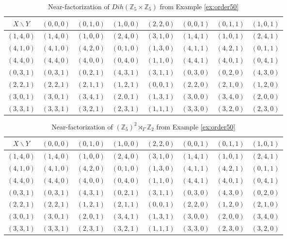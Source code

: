 \documentclass[12pt, a4paper]{article}
\theoremstyle{definition}
\begin{document}
\begin{table}[h]
\renewcommand{\arraystretch}{1.2}
\centering
\setlength\tabcolsep{3pt}
\begin{tabular}{|c|ccccccc|} 
\hline
$X \backslash Y$ & $(0,0,0)$ & $(0,1,0)$ & $(1,0,0)$ & $(2,2,0)$ & $(0,0,1)$ & $(0,1,1)$ & $(1,0,1)$ \\ \hline
$(1,4,0)$ & $(1,4,0)$ & $(1,0,0)$ & $(2,4,0)$ & $(3,1,0)$ & $(1,4,1)$ & $(1,0,1)$ & $(2,4,1)$ 
\\
$(4,1,0)$ & $(4,1,0)$ & $(4,2,0)$ & $(0,1,0)$ & $(1,3,0)$ & $(4,1,1)$ & $(4,2,1)$ & $(0,1,1)$ 
\\
$(4,4,0)$ & $(4,4,0)$ & $(4,0,0)$ & $(0,4,0)$ & $(1,1,0)$ & $(4,4,1)$ & $(4,0,1)$ & $(0,4,1)$ 
\\
$(0,3,1)$ & $(0,3,1)$ & $(0,2,1)$ & $(4,3,1)$ & $(3,1,1)$ & $(0,3,0)$ & $(0,2,0)$ & $(4,3,0)$ 
\\
$(2,2,1)$ & $(2,2,1)$ & $(2,1,1)$ & $(1,2,1)$ & $(0,0,1)$ & $(2,2,0)$ & $(2,1,0)$ & $(1,2,0)$ 
\\
$(3,0,1)$ & $(3,0,1)$ & $(3,4,1)$ & $(2,0,1)$ & $(1,3,1)$ & $(3,0,0)$ & $(3,4,0)$ & $(2,0,0)$ 
\\
$(3,3,1)$ & $(3,3,1)$ & $(3,2,1)$ & $(2,3,1)$ & $(1,1,1)$ & $(3,3,0)$ & $(3,2,0)$ & $(2,3,0)$ 
\\
\hline
\end{tabular}
\caption{Near-factorization of $Dih(\mathbb{Z}_5 \times \mathbb{Z}_5)$ from Example \ref{ex:order50}}
\label{table:Dih(Z_5^2)A}
\end{table}

\begin{table}[h]
\renewcommand{\arraystretch}{1.2}
\centering
\setlength\tabcolsep{3pt}
\begin{tabular}{|c|ccccccc|} 
\hline
$X \backslash Y$ & $(0,0,0)$ & $(0,1,0)$ & $(1,0,0)$ & $(2,2,0)$ & $(0,0,1)$ & $(0,1,1)$ & $(1,0,1)$ \\ \hline
$(1,4,0)$ & $(1,4,0)$ & $(1,0,0)$ & $(2,4,0)$ & $(3,1,0)$ & $(1,4,1)$ & $(1,0,1)$ & $(2,4,1)$ 
\\
$(4,1,0)$ & $(4,1,0)$ & $(4,2,0)$ & $(0,1,0)$ & $(1,3,0)$ & $(4,1,1)$ & $(4,2,1)$ & $(0,1,1)$ 
\\
$(4,4,0)$ & $(4,4,0)$ & $(4,0,0)$ & $(0,4,0)$ & $(1,1,0)$ & $(4,4,1)$ & $(4,0,1)$ & $(0,4,1)$ 
\\
$(0,3,1)$ & $(0,3,1)$ & $(4,3,1)$ & $(0,2,1)$ & $(3,1,1)$ & $(0,3,0)$ & $(4,3,0)$ & $(0,2,0)$ 
\\
$(2,2,1)$ & $(2,2,1)$ & $(1,2,1)$ & $(2,1,1)$ & $(0,0,1)$ & $(2,2,0)$ & $(1,2,0)$ & $(2,1,0)$ 
\\
$(3,0,1)$ & $(3,0,1)$ & $(2,0,1)$ & $(3,4,1)$ & $(1,3,1)$ & $(3,0,0)$ & $(2,0,0)$ & $(3,4,0)$ 
\\
$(3,3,1)$ & $(3,3,1)$ & $(2,3,1)$ & $(3,2,1)$ & $(1,1,1)$ & $(3,3,0)$ & $(2,3,0)$ & $(3,2,0)$ 
\\
\hline
\end{tabular}
\caption{Near-factorization of $(\mathbb{Z}_5)^2 \rtimes_{\Gamma} \mathbb{Z}_2$ from Example \ref{ex:order50}}
\label{table:Dih(Z_5^2)B}
\end{table}
\end{document}
